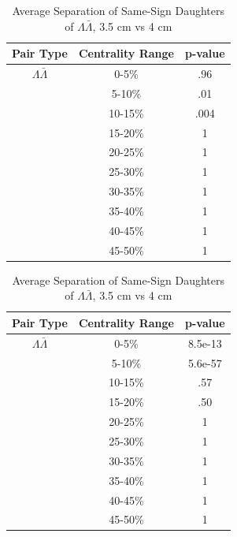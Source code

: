 \begin{table}
\begin{minipage}{18pc}
\caption{Average Separation of Same-Sign Daughters of $\Lambda\bar{\Lambda}$, 3.5 cm vs 3 cm} \label{tab:AvgSepProtDaughters35cmVs3cm}
\begin{center}
\begin{tabular}{| c | c | c |}
  \hline                       
  Pair Type & Centrality Range & p-value \\
   \hline
  $\Lambda\bar{\Lambda}$ &  0-5\% & .96 \\
   & 5-10\% & .01 \\
   & 10-15\% & .004 \\
   & 15-20\% & 1 \\
   & 20-25\% & 1 \\
   & 25-30\% & 1 \\
   & 30-35\% & 1 \\
   & 35-40\% & 1 \\
   & 40-45\% & 1 \\
   & 45-50\% & 1 \\
  \hline  
\end{tabular}
\end{center}
\end{minipage}
\begin{minipage}{18pc}
\caption{Average Separation of Same-Sign Daughters of $\Lambda\bar{\Lambda}$, 3.5 cm vs 4 cm} \label{tab:AvgSepProtDaughters35cmVs4cm}
\begin{center}
\begin{tabular}{| c | c | c |}
  \hline                       
  Pair Type & Centrality Range & p-value \\
   \hline
  $\Lambda\bar{\Lambda}$ &  0-5\% & 8.5e-13 \\
   & 5-10\% & 5.6e-57 \\
   & 10-15\% & .57 \\
   & 15-20\% & .50 \\
   & 20-25\% & 1 \\
   & 25-30\% & 1 \\
   & 30-35\% & 1 \\
   & 35-40\% & 1 \\
   & 40-45\% & 1 \\
   & 45-50\% & 1 \\
  \hline  
\end{tabular}
\end{center}
\end{minipage}
\end{table}



